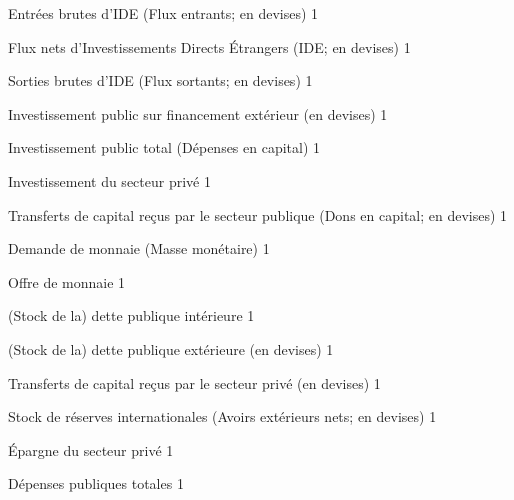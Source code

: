 \documentclass[11pt,a4paper]{article}
\newcommand{\FDI}{\mathit{FDI}}
\newcommand{\FINVG}{\mathit{FINVG}}
\newcommand{\INVG}{\mathit{INVG}}
\newcommand{\INVP}{\mathit{INVP}}
\newcommand{\KTRAG}{\mathit{KTRAG}}
\newcommand{\MD}{\mathit{MD}}
\newcommand{\NDDG}{\mathit{NDDG}}
\newcommand{\NFDG}{\mathit{NFDG}}
\newcommand{\OTHKTRA}{\mathit{OTHKTRA}}
\newcommand{\RES}{\mathit{RES}}
\newcommand{\SP}{\mathit{SP}}
\newcommand{\TOTG}{\mathit{TOTG}}
\begin{document}
\begin{description}[leftmargin=!,labelwidth=\widthof{\bfseries AAAAAAAA},parsep=9.7pt]
		\item[$\FDI^{\mathit{IN}}$]          Entrées brutes d'IDE (Flux entrants; en devises)	\hfill 1
		\item[$\FDI^{\mathit{NET}}$]         Flux nets d'Investissements Directs Étrangers (IDE; en devises)	\hfill 1
		\item[$\FDI^{\mathit{OUT}}$]         Sorties brutes d'IDE (Flux sortants; en devises)	\hfill 1
		\item[$\FINVG$]           Investissement public sur financement extérieur (en devises)	\hfill 1
		\item[$\INVG$]            Investissement public total (Dépenses en capital)	\hfill 1
		\item[$\INVP$]            Investissement du secteur privé	\hfill 1
		\item[$\KTRAG$]            Transferts de capital reçus par le secteur publique (Dons en capital; en devises)	\hfill 1
		\item[$\MD$]              Demande de monnaie (Masse monétaire)	\hfill 1
		\item[$\MD$]              Offre de monnaie	\hfill 1
		\item[$\NDDG$]            (Stock de la) dette publique intérieure	\hfill 1
		\item[$\NFDG$]            (Stock de la) dette publique extérieure (en devises)	\hfill 1
		\item[$\OTHKTRA$]          Transferts de capital reçus par le secteur privé (en devises)	\hfill 1
		\item[$\RES$]             Stock de réserves internationales (Avoirs extérieurs nets; en devises)	\hfill 1
		\item[$\SP$]              Épargne du secteur privé	\hfill 1
		\item[$\TOTG$]            Dépenses publiques totales	\hfill 1
	\end{description}
		
\end{document}

